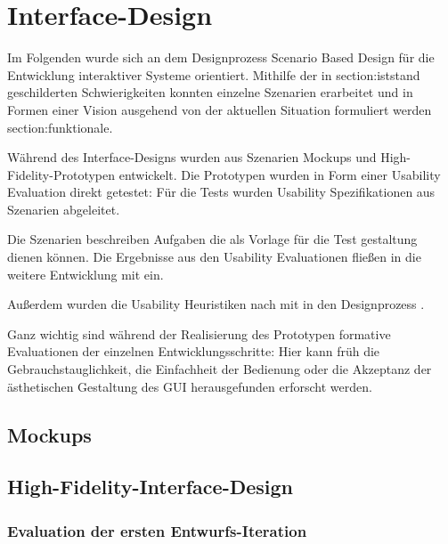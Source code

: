 \chapter{Interface-Design}
\label{chapter-design}
Im Folgenden wurde sich an dem Designprozess Scenario Based Design für die Entwicklung interaktiver
Systeme orientiert. Mithilfe der in \refname{section:iststand} geschilderten Schwierigkeiten konnten
einzelne Szenarien erarbeitet und in Formen einer Vision ausgehend von der aktuellen Situation
formuliert werden \refname{section:funktionale}.

Während des Interface-Designs wurden aus Szenarien Mockups und High-Fidelity-Prototypen entwickelt.
Die Prototypen wurden in Form einer Usability Evaluation direkt getestet: Für die Tests wurden
Usability Spezifikationen aus Szenarien abgeleitet.

Die Szenarien beschreiben Aufgaben die als Vorlage für die Test gestaltung dienen können. Die
Ergebnisse aus den Usability Evaluationen fließen in die weitere Entwicklung mit ein.

Außerdem wurden die Usability Heuristiken nach  mit in den Designprozess
.

Ganz wichtig sind während der Realisierung des Prototypen formative Evaluationen der einzelnen
Entwicklungsschritte: Hier kann früh die Gebrauchstauglichkeit, die Einfachheit der Bedienung oder
die Akzeptanz der ästhetischen Gestaltung des GUI herausgefunden erforscht werden.





\section{Mockups}

\section{High-Fidelity-Interface-Design}

\subsection{Evaluation der ersten Entwurfs-Iteration}


